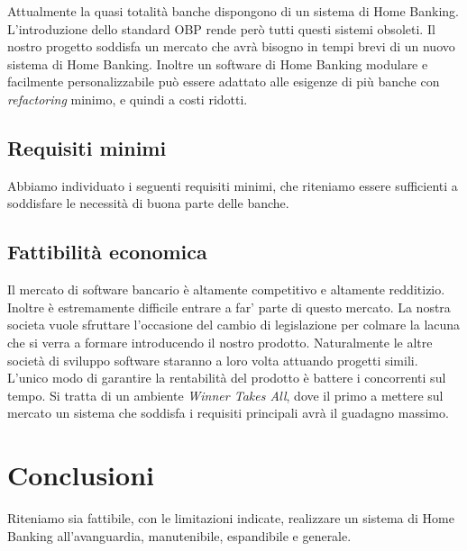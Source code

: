 \documentclass[10pt]{softeng} %
\begin{document}
Attualmente la quasi totalit\`a banche dispongono di un sistema di Home Banking.
L'introduzione dello standard OBP rende per\`o tutti questi sistemi obsoleti.
Il nostro progetto soddisfa un mercato che avr\`a bisogno in tempi brevi di un nuovo sistema di Home Banking.
Inoltre un software di Home Banking modulare e facilmente personalizzabile pu\`o essere adattato alle esigenze di pi\`u banche con \emph{refactoring} minimo, e quindi a costi ridotti.

\subsection{Requisiti minimi}

Abbiamo individuato i seguenti requisiti minimi, che riteniamo essere sufficienti a soddisfare le necessit\`a di buona parte delle banche.


\subsection{Fattibilit\`a economica}

Il mercato di software bancario \`e altamente competitivo e altamente redditizio.
Inoltre \`e estremamente difficile entrare a far' parte di questo mercato.
La nostra societa vuole sfruttare l'occasione del cambio di legislazione per colmare la lacuna che si verra a formare introducendo il nostro prodotto.
Naturalmente le altre societ\`a di sviluppo software staranno a loro volta attuando progetti simili.
L'unico modo di garantire la rentabilit\`a del prodotto \`e battere i concorrenti sul tempo.
Si tratta di un ambiente \emph{Winner Takes All}, dove il primo a mettere sul mercato un sistema che soddisfa i requisiti principali avr\`a il guadagno massimo.


\section{Conclusioni}

Riteniamo sia fattibile, con le limitazioni indicate, realizzare un sistema di Home Banking all'avanguardia, manutenibile, espandibile e generale.

\end{document}
